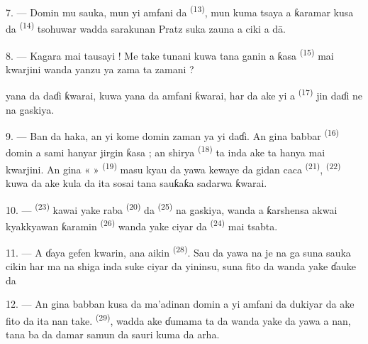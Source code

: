 7. --- Domin mu sauka, mun yi amfani da 
\textsuperscript{(13)}, mun kuma tsaya a ƙaramar  kusa da
 \textsuperscript{(14)} tsohuwar  wadda
sarakunan Pratz suka zauna a ciki a dā.

8. --- Kagara mai tausayi ! Me take tunani kuwa tana ganin a ƙasa
 \textsuperscript{(15)} mai kwarjini wanda yanzu
ya zama  ta zamani ?

 yana da daɗi ƙwarai,  kuwa
yana da amfani ƙwarai, har  da ake yi a
 \textsuperscript{(17)} jin daɗi ne na gaskiya.

\VUsaut{3.0mm}
\VUsaut{3.0mm}

9. --- Ban da haka, an yi kome domin zaman ya yi daɗi. An gina babbar
 \textsuperscript{(16)} domin a sami hanyar
jirgin ƙasa ; an shirya  \textsuperscript{(18)} ta
 inda ake  ta hanya mai
kwarjini. An gina «  » \textsuperscript{(19)} masu
kyau da yawa kewaye da gidan caca \textsuperscript{(21)},  \textsuperscript{(22)} kuwa da ake kula da ita sosai tana sauƙaƙa
sadarwa ƙwarai.

10. ---  \textsuperscript{(23)} kawai yake raba
 \textsuperscript{(20)} da  \textsuperscript{(25)}
na gaskiya, wanda a ƙarshensa akwai kyakkyawan ƙaramin 
\textsuperscript{(26)} wanda yake ciyar da 
\textsuperscript{(24)} mai tsabta.

11. --- A ɗaya gefen kwarin, ana aikin 
\textsuperscript{(28)}. Sau da yawa na je na ga  suna sauka cikin  har ma na shiga
 inda suke ciyar da yininsu, suna fito da
 wanda yake ɗauke da 

12. --- An gina babban  kusa da
ma’adinan domin a yi amfani da dukiyar da ake fito da ita nan take.
 \textsuperscript{(29)}, wadda ake ɗumama ta da
 wanda yake da yawa a nan, tana ba da damar samun
 da sauri kuma da arha.

